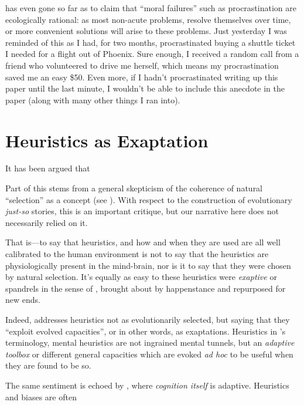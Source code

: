 \documentclass{article}
\begin{document}
\textcite{taleb15} has even gone so far as to claim that ``moral failures'' such as procrastination are ecologically rational: as most non-acute problems, resolve themselves over time, or more convenient solutions will arise to these problems.
Just yesterday I was reminded of this as I had, for two months, procrastinated buying a shuttle ticket I needed for a flight out of Phoenix.
Sure enough, I received a random call from a friend who volunteered to drive me herself, which means my procrastination saved me an easy \$50.
Even more, if I hadn't procrastinated writing up this paper until the last minute, I wouldn't be able to include this anecdote in the paper (along with many other things I ran into).

\section{Heuristics as Exaptation}


It has been argued \parencite{massimo89,gould91} that

Part of this stems from a general skepticism of the coherence of natural ``selection'' as a concept (see \textcite{fodor10}).
With respect to the construction of evolutionary \textit{just-so} stories, this is an important critique, but our narrative here does not necessarily relied on it.

That is---to say that heuristics, and how and when they are used are all well calibrated to the human environment is not to say that the heuristics are physiologically present in the mind-brain, nor is it to say that they were chosen by natural selection.
It's equally as easy to these heuristics were \emph{exaptive} \parencite{buss98} or spandrels in the sense of \textcite{gould79}, brought about by happenstance and repurposed for new ends.

Indeed, \textcite{gigerenzer08} addresses heuristics not as evolutionarily selected, but saying that they ``exploit evolved capacities'', or in other words, as exaptations.
Heuristics in \textcite{gigerenzer08}'s terminology, mental heuristics are not ingrained mental tunnels, but an \emph{adaptive toolbox} or different general capacities which are evoked \emph{ad hoc} to be useful when they are found to be so.

The same sentiment is echoed by \textcite{anderson90}, where \emph{cognition itself} is adaptive.
Heuristics and biases are often
\end{document}
